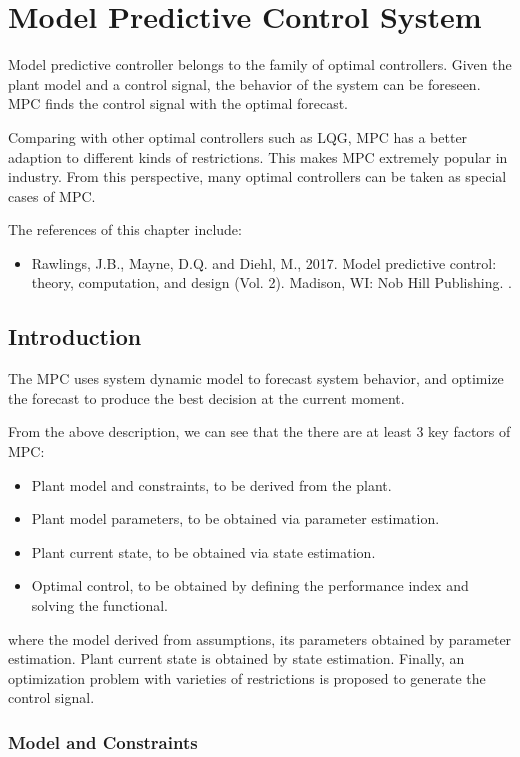 \chapter{Model Predictive Control System} \label{ch:mpcs}

Model predictive controller belongs to the family of optimal controllers. Given the plant model and a control signal, the behavior of the system can be foreseen. MPC finds the control signal with the optimal forecast.

Comparing with other optimal controllers such as LQG, MPC has a better adaption to different kinds of restrictions. This makes MPC extremely popular in industry. From this perspective, many optimal controllers can be taken as special cases of MPC.

The references of this chapter include:
\begin{itemize}
	\item Rawlings, J.B., Mayne, D.Q. and Diehl, M., 2017. Model predictive control: theory, computation, and design (Vol. 2). Madison, WI: Nob Hill Publishing. \cite{rawlings2017model}.
\end{itemize}

\section{Introduction}

The MPC uses system dynamic model to forecast system behavior, and optimize the forecast to produce the best decision at the current moment.

From the above description, we can see that the there are at least 3 key factors of MPC:
\begin{itemize}
	\item Plant model and constraints, to be derived from the plant.
    \item Plant model parameters, to be obtained via parameter estimation.
	\item Plant current state, to be obtained via state estimation.
	\item Optimal control, to be obtained by defining the performance index and solving the functional.
\end{itemize}
where the model derived from assumptions, its parameters obtained by parameter estimation. Plant current state is obtained by state estimation. Finally, an optimization problem with varieties of restrictions is proposed to generate the control signal.

\subsection{Model and Constraints}

